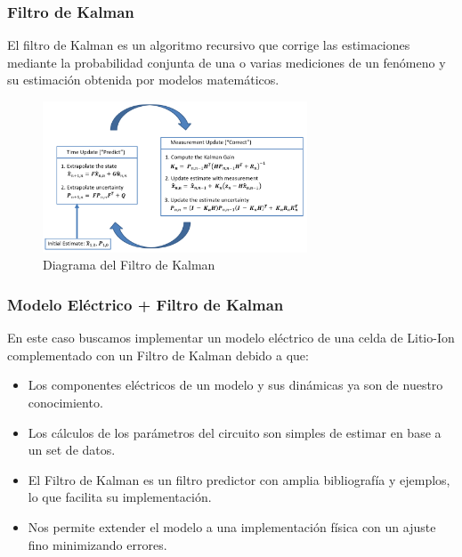 \documentclass[10pt]{beamer}
\theoremstyle{remark}
\theoremstyle{definition}
\begin{document}
\begin{frame}[allowframebreaks]
  \frametitle{Filtro de Kalman}

  El filtro de Kalman es un algoritmo recursivo que corrige las estimaciones
  mediante la probabilidad conjunta de una o varias mediciones de un fenómeno y
  su estimación obtenida por modelos matemáticos.

  \begin{figure}[h!]
	\centering
	\includegraphics[width=0.7\textwidth]{images/KalmanFilterDiagram.png}
	\caption{Diagrama del Filtro de Kalman}
	\label{fig:kf_sch}
  \end{figure}

\end{frame}

\begin{frame}[allowframebreaks]
  \frametitle{Modelo Eléctrico + Filtro de Kalman}

  En este caso buscamos implementar un modelo eléctrico de una celda de
  Litio-Ion complementado con un Filtro de Kalman debido a que:

  \begin{itemize}
	\item Los componentes eléctricos de un modelo y sus dinámicas ya son de
	  nuestro conocimiento.
	\item Los cálculos de los parámetros del circuito son simples de estimar en
	  base a un set de datos.
	\item El Filtro de Kalman es un filtro predictor con amplia bibliografía y
	  ejemplos, lo que facilita su implementación.
	\item Nos permite extender el modelo a una implementación física con un
	  ajuste fino minimizando errores.
  \end{itemize}

\end{frame}
\end{document}
